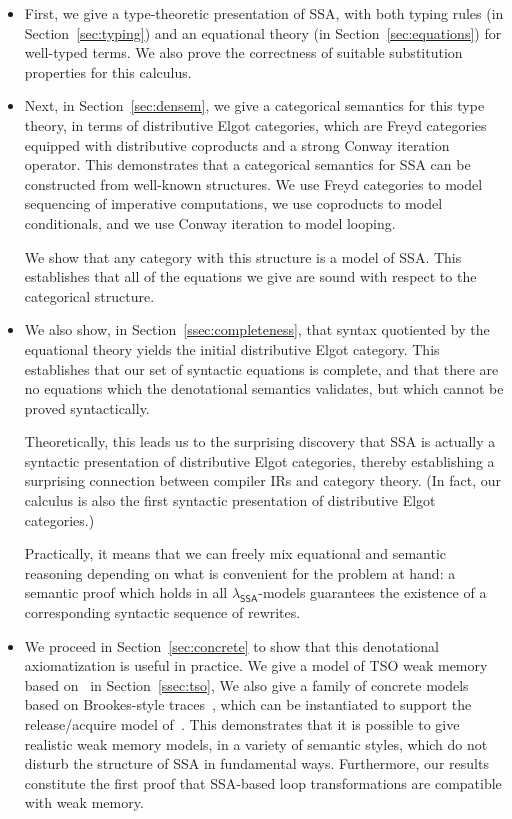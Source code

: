 \documentclass[acmsmall,screen,review]{acmart}
\newcommand{\ms}[1]{\ensuremath{\mathsf{#1}}}
\newcommand{\isotopessa}{\(\lambda_{\ms{SSA}}\)}
\begin{document}
\begin{itemize}
\item First, we give a type-theoretic presentation of SSA, with both typing rules (in
  Section~\ref{sec:typing}) and an equational theory (in Section~\ref{sec:equations}) for
  well-typed terms. We also prove the correctness of suitable substitution properties for this
  calculus. 
  
\item Next, in Section~\ref{sec:densem}, we give a categorical semantics for this type theory, in
  terms of distributive Elgot categories, which are Freyd categories equipped with distributive
  coproducts and a strong Conway iteration operator. This demonstrates that a categorical semantics
  for SSA can be constructed from well-known structures. We use Freyd categories to model sequencing of
  imperative computations,  we use coproducts to model conditionals, and we use Conway iteration to model
  looping. 

  We show that any category with this structure is a model of SSA. This establishes that all of the
  equations we give are sound with respect to the categorical structure.

\item We also show, in Section~\ref{ssec:completeness}, that syntax quotiented by the equational
  theory yields the initial distributive Elgot category. This establishes that our set of syntactic
  equations is complete, and that there are no equations which the denotational semantics validates,
  but which cannot be proved syntactically. 
  
  Theoretically, this leads us to the surprising discovery that SSA is actually a syntactic
  presentation of distributive Elgot categories, thereby establishing a surprising connection
  between compiler IRs and category theory. (In fact, our calculus is also the first syntactic
  presentation of distributive Elgot categories.) 
  
  Practically, it means that we can freely mix equational and semantic reasoning depending on what
  is convenient for the problem at hand: a semantic proof which holds in all \isotopessa{}-models
  guarantees the existence of a corresponding syntactic sequence of rewrites.

\item We proceed in Section~\ref{sec:concrete} to show that this denotational axiomatization is
  useful in practice. We give a model of TSO weak memory based on~\citet{sparky} in
  Section~\ref{ssec:tso}, We also give a family of concrete models based on Brookes-style
  traces~\cite{brookes-full-abstraction-96}, which can be instantiated to support the
  release/acquire model of~\citet{release-acquire}. This demonstrates that it is possible to give
  realistic weak memory models, in a variety of semantic styles, which do not disturb the structure
  of SSA in fundamental ways. Furthermore, our results constitute the first proof that SSA-based
  loop transformations are compatible with weak memory. 


\end{itemize}
\end{document}

